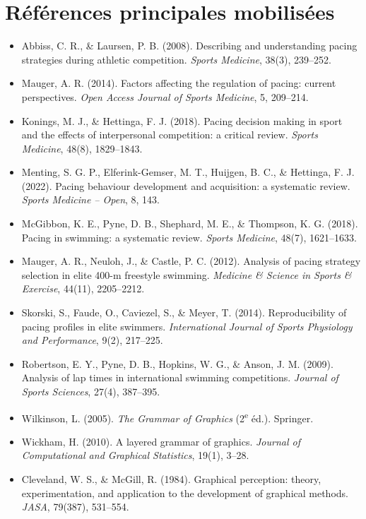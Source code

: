 \documentclass[11pt,a4paper]{article}
\begin{document}
\section*{Références principales mobilisées}
\begin{itemize}[leftmargin=*]
    \item Abbiss, C. R., \& Laursen, P. B. (2008). Describing and understanding pacing strategies during athletic competition. \textit{Sports Medicine}, 38(3), 239--252.
    \item Mauger, A. R. (2014). Factors affecting the regulation of pacing: current perspectives. \textit{Open Access Journal of Sports Medicine}, 5, 209--214.
    \item Konings, M. J., \& Hettinga, F. J. (2018). Pacing decision making in sport and the effects of interpersonal competition: a critical review. \textit{Sports Medicine}, 48(8), 1829--1843.
    \item Menting, S. G. P., Elferink-Gemser, M. T., Huijgen, B. C., \& Hettinga, F. J. (2022). Pacing behaviour development and acquisition: a systematic review. \textit{Sports Medicine -- Open}, 8, 143.
    \item McGibbon, K. E., Pyne, D. B., Shephard, M. E., \& Thompson, K. G. (2018). Pacing in swimming: a systematic review. \textit{Sports Medicine}, 48(7), 1621--1633.
    \item Mauger, A. R., Neuloh, J., \& Castle, P. C. (2012). Analysis of pacing strategy selection in elite 400-m freestyle swimming. \textit{Medicine \& Science in Sports \& Exercise}, 44(11), 2205--2212.
    \item Skorski, S., Faude, O., Caviezel, S., \& Meyer, T. (2014). Reproducibility of pacing profiles in elite swimmers. \textit{International Journal of Sports Physiology and Performance}, 9(2), 217--225.
    \item Robertson, E. Y., Pyne, D. B., Hopkins, W. G., \& Anson, J. M. (2009). Analysis of lap times in international swimming competitions. \textit{Journal of Sports Sciences}, 27(4), 387--395.
    \item Wilkinson, L. (2005). \textit{The Grammar of Graphics} (2\textsuperscript{e} éd.). Springer.
    \item Wickham, H. (2010). A layered grammar of graphics. \textit{Journal of Computational and Graphical Statistics}, 19(1), 3--28.
    \item Cleveland, W. S., \& McGill, R. (1984). Graphical perception: theory, experimentation, and application to the development of graphical methods. \textit{JASA}, 79(387), 531--554.

\end{itemize}
\end{document}
